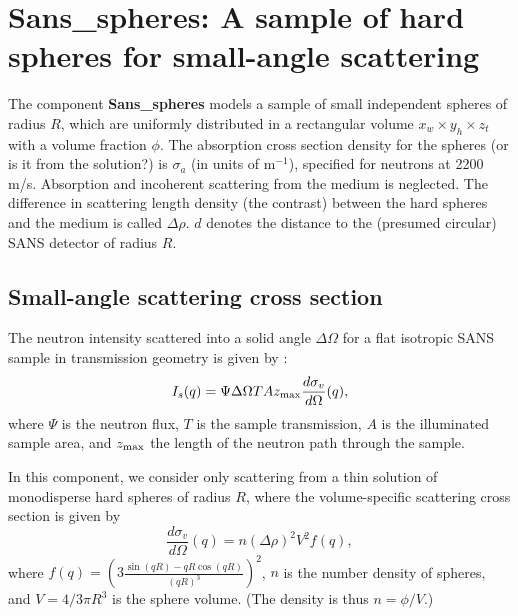 \section{Sans\_spheres: A sample of hard spheres for small-angle scattering}
\label{sans}


The component {\bf Sans\_spheres} models a sample of small independent
spheres of radius $R$, which are uniformly distributed
in a rectangular volume $x_w \times y_h \times z_t$ with a volume
fraction $\phi$. The absorption cross section density for the spheres
(or is it from the solution?)
is $\sigma_a$ (in units of m$^{-1}$), specified
for neutrons at 2200 m/s. Absorption and incoherent scattering 
from the medium is neglected.
The difference in scattering length density
(the contrast) between the hard spheres and the medium is called $\Delta \rho$.
$d$ denotes the distance to the (presumed circular) SANS detector of radius $R$.

\subsection{Small-angle scattering cross section}
The neutron intensity scattered into a solid angle $\Delta \Omega$
for a flat isotropic SANS sample in transmission geometry 
is given by \cite{ILLblue}:
\begin{equation}
I_s(q) = \Psi \Delta\Omega T A z_{\rm max} \frac{d\sigma_v}{d\Omega}(q) ,
\end{equation}
where $\Psi$ is the neutron flux, $T$ is the sample transmission,
$A$ is the illuminated sample area, and $z_{\rm max}$ the length of
the neutron path through the sample.

In this component, we consider only scattering from a thin solution
of monodisperse hard spheres of radius $R$, where the volume-specific
scattering cross section is given by \cite{ILLblue}
\begin{equation}
\frac{d\sigma_v}{d\Omega}(q) =
  n (\Delta\rho)^2 V^2 f(q)  ,
\end{equation}
where $f(q) = \left( 3\frac{\sin(qR)-qR\cos(qR)}{(qR)^3} \right)^2$,
$n$ is the number density of spheres, and $V = 4 / 3 \pi R^3$ is the
sphere volume. (The density is thus $n = \phi/V$.)

